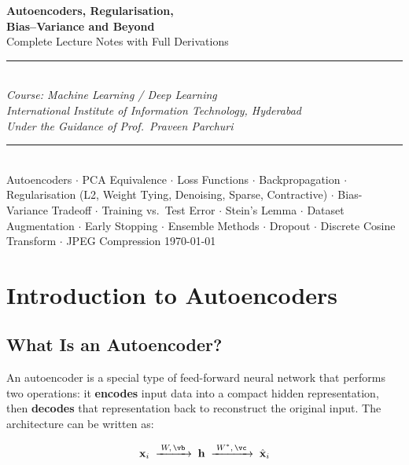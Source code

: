 \documentclass[12pt,a4paper]{article}
\newcommand{\vx}{\mathbf{x}}
\newcommand{\vh}{\mathbf{h}}
\newcommand{\hatx}{\hat{\mathbf{x}}}
\begin{document}

\begin{titlepage}
\centering
\vspace*{2cm}
{\Huge\bfseries\color{headcolor}
  Autoencoders, Regularisation,\\[0.5em]
  Bias--Variance and Beyond\\[1em]}
{\Large\color{defcolor} Complete Lecture Notes with Full Derivations}\\[2em]
\rule{\textwidth}{1.5pt}\\[1em]
{\large\textit{Course: Machine Learning / Deep Learning}}\\[0.5em]
{\large\textit{International Institute of Information Technology, Hyderabad}}\\[0.5em]
{\large\textit{Under the Guidance of Prof.\ Praveen Parchuri}}\\[2em]
\rule{\textwidth}{0.5pt}\\[1em]
{\normalsize
Autoencoders $\cdot$ PCA Equivalence $\cdot$ Loss Functions $\cdot$ Backpropagation $\cdot$
Regularisation (L2, Weight Tying, Denoising, Sparse, Contractive) $\cdot$
Bias-Variance Tradeoff $\cdot$ Training vs.\ Test Error $\cdot$ Stein's Lemma $\cdot$
Dataset Augmentation $\cdot$ Early Stopping $\cdot$ Ensemble Methods $\cdot$ Dropout $\cdot$
Discrete Cosine Transform $\cdot$ JPEG Compression
}
\vfill
{\large\today}
\end{titlepage}

\tableofcontents
\newpage

\section{Introduction to Autoencoders}

\subsection{What Is an Autoencoder?}

An autoencoder is a special type of feed-forward neural network that performs two operations: it \textbf{encodes} input data into a compact hidden representation, then \textbf{decodes} that representation back to reconstruct the original input. The architecture can be written as:

\[
\vx_i \;\xrightarrow{\;W,\,\vb\;}\; \vh \;\xrightarrow{\;W^*,\,\vc\;}\; \hatx_i
\]
\end{document}
